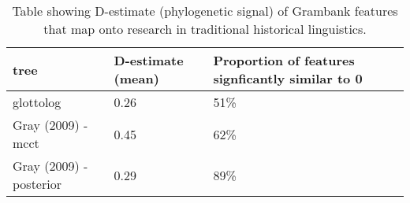 \begin{table}[ht]
\centering
\begin{tabular}{lll}
  \hline
tree & D-estimate (mean) & Proportion of features signficantly similar to 0 \\ 
  \hline
glottolog & 0.26 & 51\% \\ 
  Gray (2009) - mcct & 0.45 & 62\% \\ 
  Gray (2009) - posterior & 0.29 & 89\% \\ 
   \hline
\end{tabular}
\caption{Table showing D-estimate (phylogenetic signal) of Grambank features that map onto research in traditional historical linguistics.} 
\label{d_estimate_summary}
\end{table}
